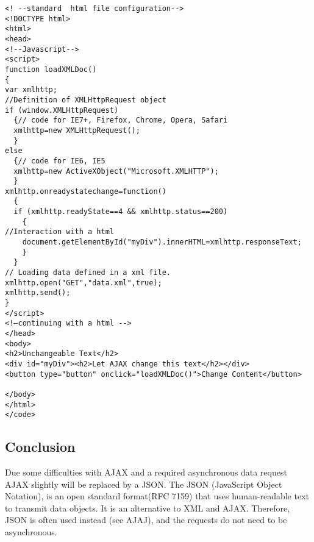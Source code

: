 \begin{lstlisting}
<! --standard  html file configuration-->
<!DOCTYPE html>
<html>
<head>
<!--Javascript-->
<script> 
function loadXMLDoc()
{
var xmlhttp;
//Definition of XMLHttpRequest object
if (window.XMLHttpRequest)
  {// code for IE7+, Firefox, Chrome, Opera, Safari
  xmlhttp=new XMLHttpRequest();
  }
else
  {// code for IE6, IE5
  xmlhttp=new ActiveXObject("Microsoft.XMLHTTP");
  }
xmlhttp.onreadystatechange=function()
  {
  if (xmlhttp.readyState==4 && xmlhttp.status==200)
    {
//Interaction with a html
    document.getElementById("myDiv").innerHTML=xmlhttp.responseText;
    }
  }
// Loading data defined in a xml file.
xmlhttp.open("GET","data.xml",true);
xmlhttp.send();
}
</script>
<!—continuing with a html -->
</head>
<body>
<h2>Unchangeable Text</h2> 
<div id="myDiv"><h2>Let AJAX change this text</h2></div>
<button type="button" onclick="loadXMLDoc()">Change Content</button>

</body>
</html>
</code>

\end{lstlisting}
\subsection{Conclusion}
Due some difficulties with AJAX and a required asynchronous data request AJAX slightly will be replaced by a JSON.
The JSON (JavaScript Object Notation), is an open standard format(RFC 7159) that uses human-readable text to transmit data objects. It is an alternative to XML and AJAX. Therefore, JSON is often used instead (see AJAJ), and the requests do not need to be asynchronous.\cite {wk02}
